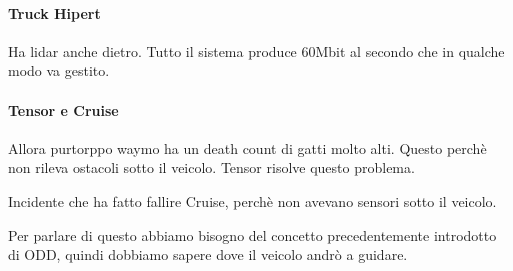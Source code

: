 \paragraph{Truck Hipert}
Ha lidar anche dietro.
Tutto il sistema produce 60Mbit al secondo che in qualche modo va gestito.

\paragraph{Tensor e Cruise}
Allora purtorppo waymo ha un death count di gatti molto alti. Questo perchè non rileva ostacoli sotto il veicolo.
Tensor risolve questo problema.

Incidente che ha fatto fallire Cruise, perchè non avevano sensori sotto il veicolo. 

Per parlare di questo abbiamo bisogno del concetto precedentemente introdotto di ODD, quindi dobbiamo sapere dove il veicolo andrò a guidare.
